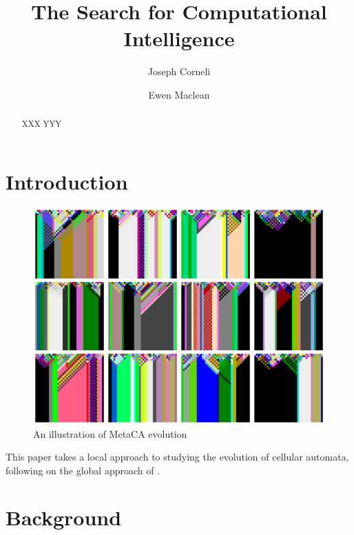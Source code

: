 \documentclass{AISB2008}
\begin{document}
\title{The Search for Computational Intelligence}

\author{Joseph Corneli%
%
\and%
Ewen Maclean%
}

\maketitle


\begin{abstract}
XXX YYY
\end{abstract}

\section{Introduction}

\begin{figure}
\includegraphics[width=\columnwidth]{metaca.png}
\caption{An illustration of MetaCA evolution\label{metaca-taster}}
\end{figure}

This paper takes a local approach to studying the
evolution of cellular automata, following on the
global approach of \cite{pavlic2014self}.

\newpage

\section{Background}
\end{document}
